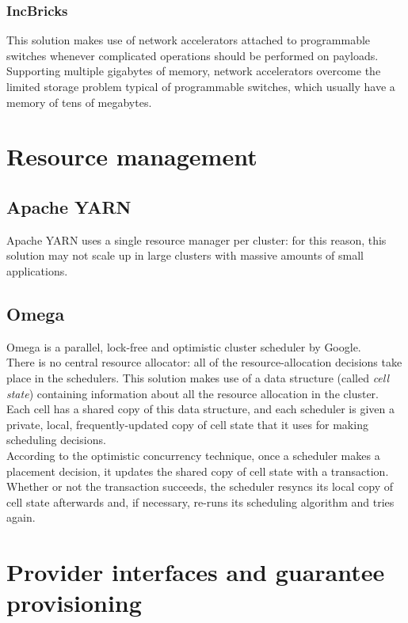 \documentclass[a4paper, 11pt]{article}
\begin{document}
\subsubsection{IncBricks \cite{incbricks}}
This solution makes use of network accelerators attached to programmable switches whenever complicated operations should be performed on payloads.\\
Supporting multiple gigabytes of memory, network accelerators overcome the limited storage problem typical of programmable switches, which usually have a memory of tens of megabytes.

\section{Resource management}
\subsection{Apache YARN \cite{yarn}}
Apache YARN \cite{yarn} uses a single resource manager per cluster: for this reason, this solution may not scale up in large clusters with massive amounts of small applications. 
\subsection{Omega \cite{omega}}
Omega \cite{omega} is a parallel, lock-free and optimistic cluster scheduler by Google.\\
There is no central resource allocator: all of the resource-allocation decisions take place in the schedulers. This solution makes use of a data structure (called \textit{cell state}) containing information about all the resource allocation in the cluster. Each cell has a shared copy of this data structure, and each scheduler is given a private, local, frequently-updated copy of cell state that it uses for making scheduling decisions.\\
According to the optimistic concurrency technique, once a scheduler makes a placement decision, it updates the shared copy of cell state with a transaction. Whether or not the transaction succeeds, the scheduler resyncs its local copy of cell state afterwards and, if necessary, re-runs its scheduling algorithm and tries again.

\section{Provider interfaces and guarantee provisioning}
\end{document}
